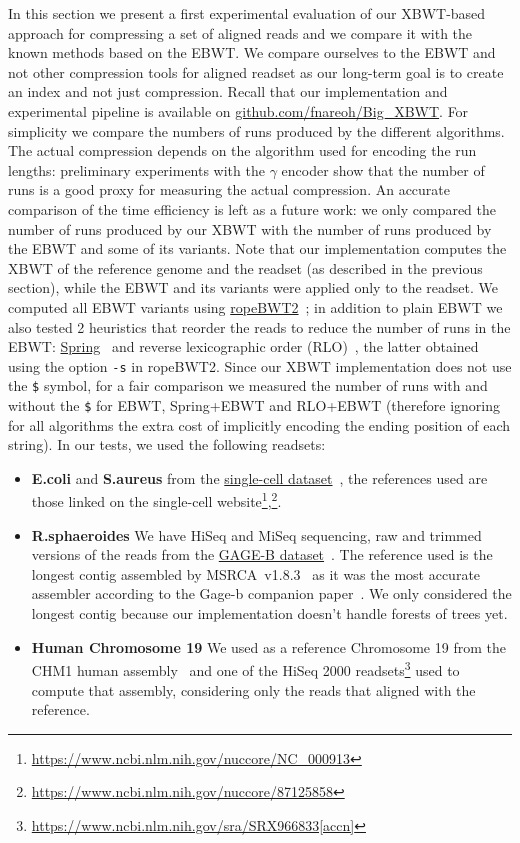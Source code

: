 In this section we present a first experimental evaluation of our XBWT-based approach for compressing a set of aligned reads and we compare it with the known methods based on the EBWT. We compare ourselves to the EBWT and not other compression tools for aligned readset as our long-term goal is to create an index and not just compression. Recall that our implementation and experimental pipeline is available on \href{https://github.com/fnareoh/Big_XBWT}{ github.com/fnareoh/Big\_XBWT}. For simplicity we compare the numbers of runs produced by the different algorithms. The actual compression depends on the algorithm used for encoding the run lengths: preliminary experiments with the $\gamma$ encoder show that the number of runs is a good proxy for measuring the actual compression. An accurate comparison of the time efficiency is left as a future work: we only compared the number of runs produced by our XBWT with the number of runs produced by the EBWT and some of its variants. Note that our implementation computes the XBWT of the reference genome and the readset (as described in the previous section), while the EBWT and its variants were applied only to the readset. We computed all EBWT variants using \href{https://github.com/lh3/ropebwt2}{{ropeBWT2}}~\cite{ropebwt2}; in addition to plain EBWT we also tested 2 heuristics that reorder the reads to reduce the number of runs in the EBWT: \href{https://github.com/shubhamchandak94/Spring/tree/reorder-only}{{Spring}}~\cite{spring} and reverse lexicographic order (RLO)~\cite{RLO}, the latter obtained using the option \texttt{-s} in ropeBWT2. Since our XBWT implementation does not use the \texttt{\$} symbol, for a fair comparison we measured the number of runs with and without the \texttt{\$} for EBWT, Spring+EBWT and RLO+EBWT (therefore ignoring for all algorithms the extra cost of implicitly encoding the ending position of each string). 
In our tests, we used the following readsets:
\begin{itemize}
    \item \textbf{E.coli} and \textbf{S.aureus} from the \href{http://bix.ucsd.edu/projects/singlecell/nbt_data.html}{{single-cell dataset}}~\cite{single-cell}, the references used are those linked on the single-cell website\footnote{\url{https://www.ncbi.nlm.nih.gov/nuccore/NC_000913}},\footnote{\url{https://www.ncbi.nlm.nih.gov/nuccore/87125858}}.
    \item \textbf{R.sphaeroides} We have HiSeq and MiSeq sequencing, raw and trimmed versions of the reads from the \href{https://ccb.jhu.edu/gage_b/}{GAGE-B dataset}~\cite{Gage-b}. The reference used is the longest contig assembled by MSRCA~v1.8.3~\cite{MSRCA} as it was the most accurate assembler according to the Gage-b companion paper~\cite{Gage-b}. We only considered the longest contig because our implementation doesn't handle forests of trees yet.
    \item \textbf{Human Chromosome 19}  We used
    as a reference Chromosome 19 from the CHM1 human assembly~\cite{chr19_chm1} and one of the HiSeq 2000 readsets\footnote{\url{https://www.ncbi.nlm.nih.gov/sra/SRX966833[accn]}} used to compute that assembly, considering only the reads that aligned with the reference.
\end{itemize}

